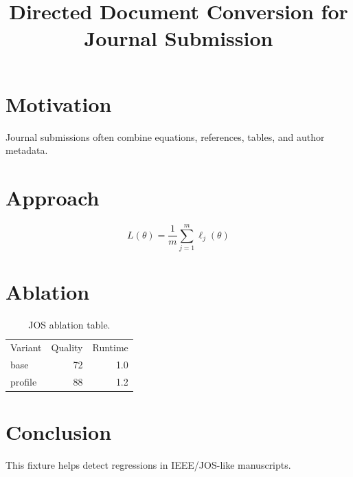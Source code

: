 \documentclass[journal]{IEEEtran}
\begin{document}
\title{Directed Document Conversion for Journal Submission}
\author{}
\maketitle
\section{Motivation}
Journal submissions often combine equations, references, tables, and author metadata.
\section{Approach}
\begin{equation}
  L(\theta)=\frac{1}{m}\sum_{j=1}^{m}\ell_j(\theta)
\end{equation}
\section{Ablation}
\begin{table}[ht]
\centering
\begin{tabular}{lrr}
Variant & Quality & Runtime\\
base & 72 & 1.0\\
profile & 88 & 1.2\\
\end{tabular}
\caption{JOS ablation table.}
\end{table}
\section{Conclusion}
This fixture helps detect regressions in IEEE/JOS-like manuscripts.
\end{document}
